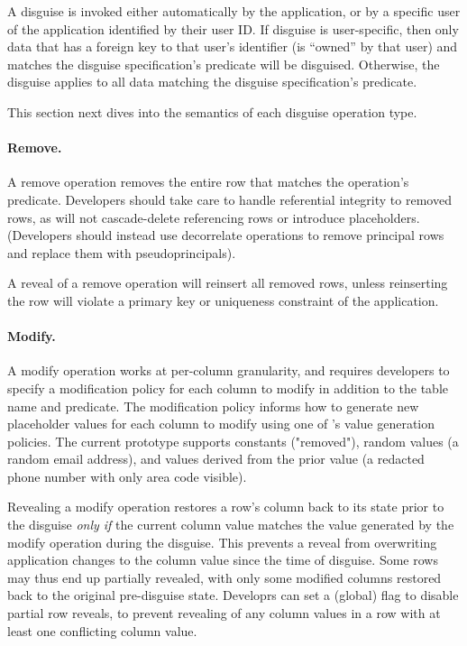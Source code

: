 %
A disguise is invoked either automatically by the application, or by a specific
user of the application identified by their user ID. 
% 
If disguise is user-specific, then only data that has a foreign key to that
user's identifier (is ``owned'' by that user) and matches the disguise
specification's predicate will be disguised.  Otherwise, the disguise applies to
all data matching the disguise specification's predicate.

This section next dives into the semantics of each disguise operation type.
%

\paragraph{Remove.}
A remove operation removes the entire row that matches the operation's
predicate.
%
Developers should take care to handle referential integrity to removed rows, as
\sys will not cascade-delete referencing rows or introduce placeholders.
(Developers should instead use decorrelate operations to remove principal
rows and replace them with pseudoprincipals).
%

%
A reveal of a remove operation will reinsert all removed rows, unless
reinserting the row will violate a primary key or uniqueness constraint of the
application.
%

%
\paragraph{Modify.}
A modify operation works at per-column granularity, and requires developers to
specify a modification policy for each column to modify in addition to the table
name and predicate.
%
The modification policy informs \sys how to generate new placeholder values for
each column to modify using one of \sys's value generation policies. The current
prototype supports constants (\eg "removed"), random values (\eg a random email
address), and values derived from the prior value (\eg a redacted phone number
with only area code visible).
%

%
Revealing a modify operation restores a row's column back to its state prior
to the disguise \emph{only if} the current column value matches the value
generated by the modify operation during the disguise. This prevents a reveal
from overwriting application changes to the column value since the time of
disguise.
%
Some rows may thus end up partially revealed, with only some modified columns
restored back to the original pre-disguise state.  Developrs can set a (global)
flag to disable partial row reveals, to prevent revealing of any column values
in a row with at least one conflicting column value.
%

